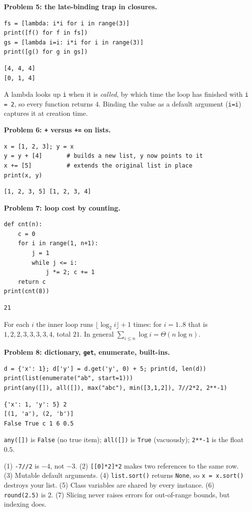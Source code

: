\documentclass[11pt,a4paper]{article}
\newcommand{\py}[1]{\texttt{#1}}
\begin{document}
\textbf{Problem 5: the late-binding trap in closures.}
\begin{lstlisting}
fs = [lambda: i*i for i in range(3)]
print([f() for f in fs])
gs = [lambda i=i: i*i for i in range(3)]
print([g() for g in gs])
\end{lstlisting}
\begin{lstlisting}[style=out]
[4, 4, 4]
[0, 1, 4]
\end{lstlisting}
A lambda looks up \py{i} when it is \emph{called}, by which time the loop has finished with \py{i = 2}, so every function returns $4$. Binding the value as a default argument (\py{i=i}) captures it at creation time.

\textbf{Problem 6: \py{+} versus \py{+=} on lists.}
\begin{lstlisting}
x = [1, 2, 3]; y = x
y = y + [4]       # builds a new list, y now points to it
x += [5]          # extends the original list in place
print(x, y)
\end{lstlisting}
\begin{lstlisting}[style=out]
[1, 2, 3, 5] [1, 2, 3, 4]
\end{lstlisting}

\textbf{Problem 7: loop cost by counting.}
\begin{lstlisting}
def cnt(n):
    c = 0
    for i in range(1, n+1):
        j = 1
        while j <= i:
            j *= 2; c += 1
    return c
print(cnt(8))
\end{lstlisting}
\begin{lstlisting}[style=out]
21
\end{lstlisting}
For each $i$ the inner loop runs $\lfloor\log_2 i\rfloor+1$ times: for $i=1..8$ that is $1,2,2,3,3,3,3,4$, total $21$. In general $\sum_{i\le n}\log i=\Theta(n\log n)$.

\textbf{Problem 8: dictionary, \py{get}, enumerate, built-ins.}
\begin{lstlisting}
d = {'x': 1}; d['y'] = d.get('y', 0) + 5; print(d, len(d))
print(list(enumerate("ab", start=1)))
print(any([]), all([]), max("abc"), min([3,1,2]), 7//2*2, 2**-1)
\end{lstlisting}
\begin{lstlisting}[style=out]
{'x': 1, 'y': 5} 2
[(1, 'a'), (2, 'b')]
False True c 1 6 0.5
\end{lstlisting}
\py{any([])} is \py{False} (no true item); \py{all([])} is \py{True} (vacuously); \py{2**-1} is the float $0.5$.

\begin{trap}
(1) \py{-7//2} is $-4$, not $-3$. (2) \py{[[0]*2]*2} makes two references to the same row. (3) Mutable default arguments. (4) \py{list.sort()} returns \py{None}, so \py{x = x.sort()} destroys your list. (5) Class variables are shared by every instance. (6) \py{round(2.5)} is $2$. (7) Slicing never raises errors for out-of-range bounds, but indexing does.
\end{trap}
\end{document}
